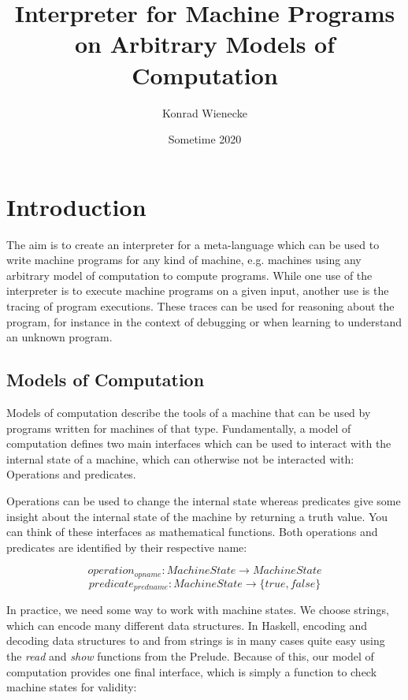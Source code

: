 \documentclass[12pt, a4paper]{article}
\title{Interpreter for Machine Programs on Arbitrary Models of Computation}
\author{Konrad Wienecke}
\date{Sometime 2020}
\begin{document}
\maketitle

\tableofcontents

\section{Introduction}
The aim is to create an interpreter for a meta-language which can be used to write machine programs for any kind of machine, e.g. machines using any arbitrary model of computation to compute programs. %
While one use of the interpreter is to execute machine programs on a given input, another use is the tracing of program executions. These traces can be used for reasoning about the program, for instance in the context of debugging or when learning to understand an unknown program.

\subsection{Models of Computation}
Models of computation describe the tools of a machine that can be used by programs written for machines of that type. Fundamentally, a model of computation defines two main interfaces which can be used to interact with the internal state of a machine, which can otherwise not be interacted with: Operations and predicates.

Operations can be used to change the internal state whereas predicates give some insight about the internal state of the machine by returning a truth value. You can think of these interfaces as mathematical functions. Both operations and predicates are identified by their respective name:

\[operation_{opname} \colon MachineState \rightarrow MachineState\]
\[predicate_{predname} \colon MachineState \rightarrow \{true, false\}\]

In practice, we need some way to work with machine states. We choose strings, which can encode many different data structures. In Haskell, encoding and decoding data structures to and from strings is in many cases quite easy using the \emph{read} and \emph{show} functions from the Prelude. Because of this, our model of computation provides one final interface, which is simply a function to check machine states for validity:
\end{document}
